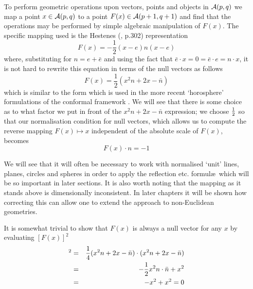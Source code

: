 To perform geometric operations upon vectors, points and objects
in $\mathcal{A}(p,q)$ we map a point $x \in \mathcal{A}(p,q)$ to a point
$F(x) \in \mathcal{A}(p+1,q+1)$ and find that the operations may be performed
by simple algebraic manipulation of $F(x)$. The specific mapping
used is the Hestenes (\cite{HS84}, p.302) representation
%
\begin{equation}
F(x)=-\frac{1}{2}(x-e)n(x-e)
\end{equation}
%
where, substituting for $n=e+\bar{e}$ and using the fact that
$\bar{e}\cdot x = 0 = \bar{e}\cdot e = n\cdot x$, it is not
hard to rewrite this equation in terms of the null
vectors as follows
%
\begin{equation}
  F(x) = \frac{1}{2}(x^2n + 2x - \bar{n})
\end{equation}
%
which is similar to the form which is used in the more recent
`horosphere' formulations of the conformal framework
\cite{oldwine}. We will see that there is some choice as
to what factor we put in front of the $x^2n + 2x -
\bar{n}$ expression; we choose $\frac{1}{2}$ so that our
normalisation condition for null vectors, which allows us to
compute the reverse mapping $F(x) \mapsto x$ independent of the
absolute scale of $F(x)$, becomes
%
\[ F(x)\cdot n = -1  \]
%

We will see that it will often be necessary to work with
normalised `unit' lines, planes, circles and spheres in order to
apply the reflection etc. formul\ae\ which will be so
important in later sections. It is also worth noting that the
mapping as it stands above is dimensionally inconsistent. In later
chapters it will be shown how correcting this can allow
one to extend the approach to non-Euclidean geometries.

It is somewhat trivial to show that $F(x)$ is always a null vector for
any $x$ by evaluating $[F(x)]^2$
%
\begin{eqnarray}
 [F(x)]^2 & = &  \frac{1}{4}(x^2n + 2x - \bar{n})\cdot (x^2n + 2x - \bar{n}) \nn \\
              & = & -\frac{1}{2}x^2 n\cdot \bar{n} + x^2  \nn \\
              & = &  -x^2 + x^2 = 0
\end{eqnarray}
%

